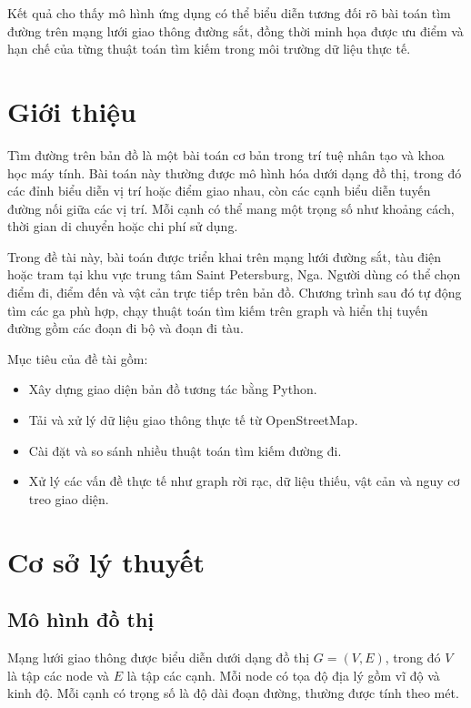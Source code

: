 \documentclass[12pt,a4paper]{article}
\begin{document}
Kết quả cho thấy mô hình ứng dụng có thể biểu diễn tương đối rõ bài toán tìm đường trên mạng lưới giao thông đường sắt, đồng thời minh họa được ưu điểm và hạn chế của từng thuật toán tìm kiếm trong môi trường dữ liệu thực tế.

\newpage
\tableofcontents
\newpage
\listoftables
\newpage
\listoffigures
\newpage


\section{Giới thiệu}

Tìm đường trên bản đồ là một bài toán cơ bản trong trí tuệ nhân tạo và khoa học máy tính. Bài toán này thường được mô hình hóa dưới dạng đồ thị, trong đó các đỉnh biểu diễn vị trí hoặc điểm giao nhau, còn các cạnh biểu diễn tuyến đường nối giữa các vị trí. Mỗi cạnh có thể mang một trọng số như khoảng cách, thời gian di chuyển hoặc chi phí sử dụng.

Trong đề tài này, bài toán được triển khai trên mạng lưới đường sắt, tàu điện hoặc tram tại khu vực trung tâm Saint Petersburg, Nga. Người dùng có thể chọn điểm đi, điểm đến và vật cản trực tiếp trên bản đồ. Chương trình sau đó tự động tìm các ga phù hợp, chạy thuật toán tìm kiếm trên graph và hiển thị tuyến đường gồm các đoạn đi bộ và đoạn đi tàu.

Mục tiêu của đề tài gồm:
\begin{itemize}
    \item Xây dựng giao diện bản đồ tương tác bằng Python.
    \item Tải và xử lý dữ liệu giao thông thực tế từ OpenStreetMap.
    \item Cài đặt và so sánh nhiều thuật toán tìm kiếm đường đi.
    \item Xử lý các vấn đề thực tế như graph rời rạc, dữ liệu thiếu, vật cản và nguy cơ treo giao diện.
\end{itemize}

\section{Cơ sở lý thuyết}

\subsection{Mô hình đồ thị}

Mạng lưới giao thông được biểu diễn dưới dạng đồ thị $G=(V,E)$, trong đó $V$ là tập các node và $E$ là tập các cạnh. Mỗi node có tọa độ địa lý gồm vĩ độ và kinh độ. Mỗi cạnh có trọng số là độ dài đoạn đường, thường được tính theo mét.
\end{document}
